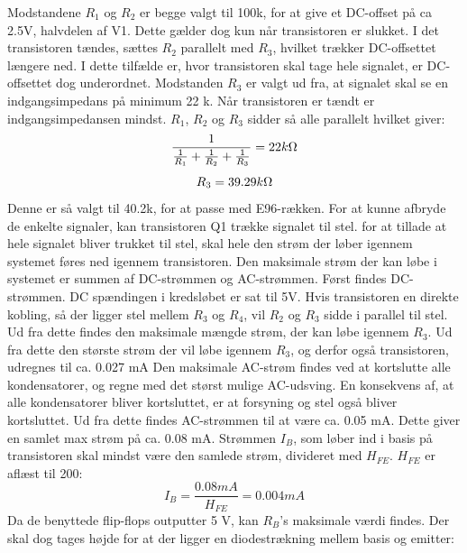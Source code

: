 Modstandene $R_1$ og $R_2$ er begge valgt til 100k\ohm, for at give et DC-offset på ca 2.5V, halvdelen af V1. Dette gælder dog kun når transistoren er slukket. I det transistoren tændes, sættes $R_2$ parallelt med $R_3$, hvilket trækker DC-offsettet længere ned.
I dette tilfælde er, hvor transistoren skal tage hele signalet, er DC-offsettet dog underordnet. 
Modstanden $R_3$ er valgt ud fra, at signalet skal se en indgangsimpedans på minimum 22 k\ohm. Når transistoren er tændt er indgangsimpedansen mindst. $R_1$, $R_2$ og $R_3$ sidder så alle parallelt hvilket giver:
\begin{equation}
\frac{1}{\frac{1}{R_1}+\frac{1}{R_2}+\frac{1}{R_3}}=22 k\ohm
\end{equation}
\begin{equation}
R_3=39.29 k\ohm
\end{equation}
Denne er så valgt til 40.2k\ohm, for at passe med E96-rækken.
For at kunne afbryde de enkelte signaler, kan transistoren Q1 trække signalet til stel. for at tillade at hele signalet bliver trukket til stel, skal hele den strøm der løber igennem systemet føres ned igennem transistoren. Den maksimale strøm der kan løbe i systemet er summen af DC-strømmen og AC-strømmen. 
Først findes DC-strømmen. DC spændingen i kredsløbet er sat til 5V. Hvis transistoren en direkte kobling, så der ligger stel mellem $R_3$ og $R_4$, vil $R_2$ og $R_3$ sidde i parallel til stel. Ud fra dette findes den maksimale mængde strøm, der kan løbe igennem $R_3$. Ud fra dette den største strøm der vil løbe igennem $R_3$, og derfor også transistoren, udregnes til ca. 0.027 mA
Den maksimale AC-strøm findes ved at kortslutte alle kondensatorer, og regne med det størst mulige AC-udsving. En konsekvens af, at alle kondensatorer bliver kortsluttet, er at forsyning og stel også bliver kortsluttet. Ud fra dette findes AC-strømmen til at være ca. 0.05 mA. Dette giver en samlet max strøm på ca. 0.08 mA.
Strømmen $I_B$, som løber ind i basis på transistoren skal mindst være den samlede strøm, divideret med $H_{FE}$. $H_{FE}$ er aflæst til 200:
\begin{equation}
I_B = \frac{0.08 mA}{H_{FE}} = 0.004 mA
\end{equation}
Da de benyttede flip-flops outputter 5 V, kan $R_B$'s maksimale værdi findes. Der skal dog tages højde for at der ligger en diodestrækning mellem basis og emitter:
